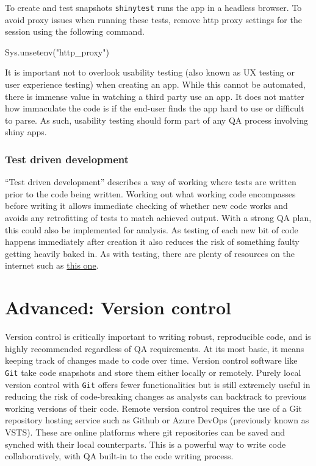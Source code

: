 \documentclass[
]{book}
\newenvironment{Shaded}{\begin{snugshade}}{\end{snugshade}}
\newcommand{\FunctionTok}[1]{\textcolor[rgb]{0.00,0.00,0.00}{#1}}
\newcommand{\NormalTok}[1]{#1}
\newcommand{\StringTok}[1]{\textcolor[rgb]{0.31,0.60,0.02}{#1}}
\begin{document}
To create and test snapshots \texttt{shinytest} runs the app in a headless browser. To avoid proxy issues when running these tests, remove http proxy settings for the session using the following command.

\begin{Shaded}
\begin{Highlighting}[]
\FunctionTok{Sys.unsetenv}\NormalTok{(}\StringTok{"http\_proxy"}\NormalTok{)}
\end{Highlighting}
\end{Shaded}

It is important not to overlook usability testing (also known as UX testing or user experience testing) when creating an app. While this cannot be automated, there is immense value in watching a third party use an app. It does not matter how immaculate the code is if the end-user finds the app hard to use or difficult to parse. As such, usability testing should form part of any QA process involving shiny apps.

\hypertarget{test-driven-development}{%
\subsection{Test driven development}\label{test-driven-development}}

``Test driven development'' describes a way of working where tests are written prior to the code being written. Working out what working code encompasses before writing it allows immediate checking of whether new code works and avoids any retrofitting of tests to match achieved output. With a strong QA plan, this could also be implemented for analysis. As testing of each new bit of code happens immediately after creation it also reduces the risk of something faulty getting heavily baked in. As with testing, there are plenty of resources on the internet such as \href{https://www.guru99.com/test-driven-development.html}{this one}.

\hypertarget{VC}{%
\chapter{Advanced: Version control}\label{VC}}

Version control is critically important to writing robust, reproducible code, and is highly recommended regardless of QA requirements. At its most basic, it means keeping track of changes made to code over time. Version control software like \texttt{Git} take code snapshots and store them either locally or remotely. Purely local version control with \texttt{Git} offers fewer functionalities but is still extremely useful in reducing the risk of code-breaking changes as analysts can backtrack to previous working versions of their code. Remote version control requires the use of a Git repository hosting service such as Github or Azure DevOps (previously known as VSTS). These are online platforms where git repositories can be saved and synched with their local counterparts. This is a powerful way to write code collaboratively, with QA built-in to the code writing process.
\end{document}
